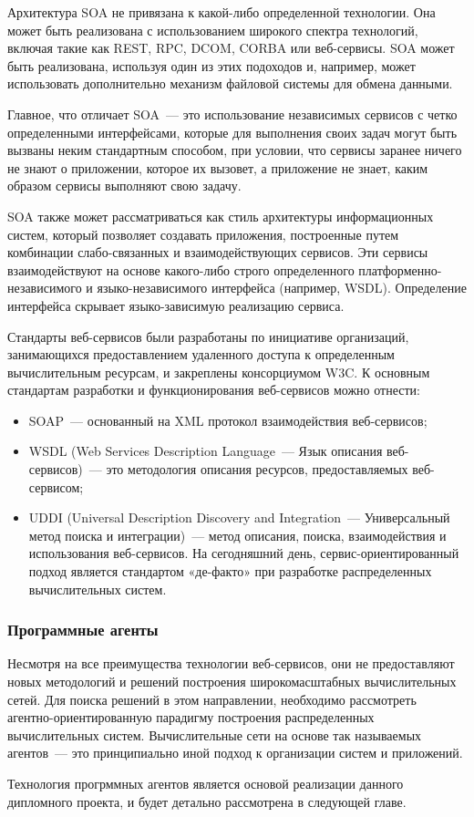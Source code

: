 Архитектура SOA не привязана к какой-либо определенной технологии. Она может быть реализована с использованием широкого спектра технологий, включая такие как REST, RPC, DCOM, CORBA или веб-сервисы. SOA может быть реализована, используя один из этих подоходов и, например, может использовать дополнительно механизм файловой системы для обмена данными.

Главное, что отличает SOA~--- это использование независимых сервисов с четко определенными интерфейсами, которые для выполнения своих задач могут быть вызваны неким стандартным способом, при условии, что сервисы заранее ничего не знают о приложении, которое их вызовет, а приложение не знает, каким образом сервисы выполняют свою задачу.

SOA также может рассматриваться как стиль архитектуры информационных систем, который позволяет создавать приложения, построенные путем комбинации слабо-связанных и взаимодействующих сервисов. Эти сервисы взаимодействуют на основе какого-либо строго определенного платформенно-независимого и языко-независимого интерфейса (например, WSDL). Определение интерфейса скрывает языко-зависимую реализацию сервиса.

Стандарты веб-сервисов были разработаны по инициативе организаций, занимающихся предоставлением удаленного доступа к определенным вычислительным ресурсам, и закреплены консорциумом W3C. К основным стандартам разработки и функционирования веб-сервисов можно отнести:
\begin{itemize}
\item SOAP~--- основанный на XML протокол взаимодействия веб-сервисов;
\item WSDL (Web Services Description Language~--- Язык описания веб-сервисов)~--- это методология описания ресурсов, предоставляемых веб-сервисом;
\item UDDI (Universal Description Discovery and Integration~--- Универсальный метод поиска и интеграции)~--- метод описания, поиска, взаимодействия и использования веб-сервисов. На сегодняшний день, сервис-ориентированный подход является стандартом «де-факто» при разработке распределенных вычислительных систем.
\end{itemize}

\subsubsection{Программные агенты}
Несмотря на все преимущества технологии веб-сервисов, они не предоставляют новых методологий и решений построения широкомасштабных вычислительных сетей. Для поиска решений в этом направлении, необходимо рассмотреть агентно-ориентированную парадигму построения распределенных вычислительных систем. Вычислительные сети на основе так называемых агентов~--- это принципиально иной подход к организации систем и приложений.

Технология прогрммных агентов является основой реализации данного дипломного проекта, и будет детально рассмотрена в следующей главе.
